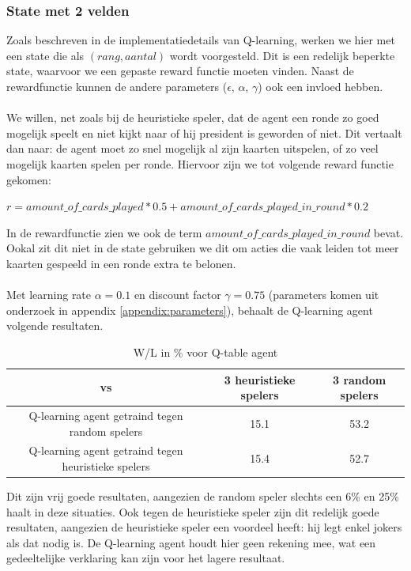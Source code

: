 \documentclass[11pt]{article}
\begin{document}
\subsubsection{State met 2 velden}
Zoals beschreven in de implementatiedetails van Q-learning, werken we hier met een state die als $(rang, aantal)$ wordt voorgesteld. Dit is een redelijk beperkte state, waarvoor we een gepaste reward functie moeten vinden. Naast de rewardfunctie kunnen de andere parameters ($\epsilon$, $\alpha$, $\gamma$) ook een invloed hebben.\\\\
We willen, net zoals bij de heuristieke speler, dat de agent een ronde zo goed mogelijk speelt en niet kijkt naar of hij president is geworden of niet. Dit vertaalt dan naar: de agent moet zo snel mogelijk al zijn kaarten uitspelen, of zo veel mogelijk kaarten spelen per ronde. Hiervoor zijn we tot volgende reward functie gekomen:
\begin{center}
$r = amount\_of\_cards\_played * 0.5 + amount\_of\_cards\_played\_in\_round * 0.2$
\end{center}
In de rewardfunctie zien we ook de term $amount\_of\_cards\_played\_in\_round$ bevat. Ookal zit dit niet in de state gebruiken we dit om acties die vaak leiden tot meer kaarten gespeeld in een ronde extra te belonen.\\\\
Met learning rate $\alpha = 0.1$ en discount factor $\gamma = 0.75$ (parameters komen uit onderzoek in appendix \ref{appendix:parameters}), behaalt de Q-learning agent volgende resultaten. 
\begin{table}[H]
        \centering
        \begin{tabular}{|c|c|c|}
                \hline
                  vs           & 3 heuristieke spelers & 3 random spelers \\
                \hline
                 Q-learning agent getraind tegen random spelers & 15.1  & 53.2\\
                 Q-learning agent getraind tegen heuristieke spelers & 15.4 & 52.7\\
                \hline
        \end{tabular}
        \caption{W/L in \% voor Q-table agent}
\end{table}
\noindent Dit zijn vrij goede resultaten, aangezien de random speler slechts een 6\% en 25\% haalt in deze situaties. Ook tegen de heuristieke speler zijn dit redelijk goede resultaten, aangezien de heuristieke speler een voordeel heeft: hij legt enkel jokers als dat nodig is. De Q-learning agent houdt hier geen rekening mee, wat een gedeeltelijke verklaring kan zijn voor het lagere resultaat.
\end{document}
